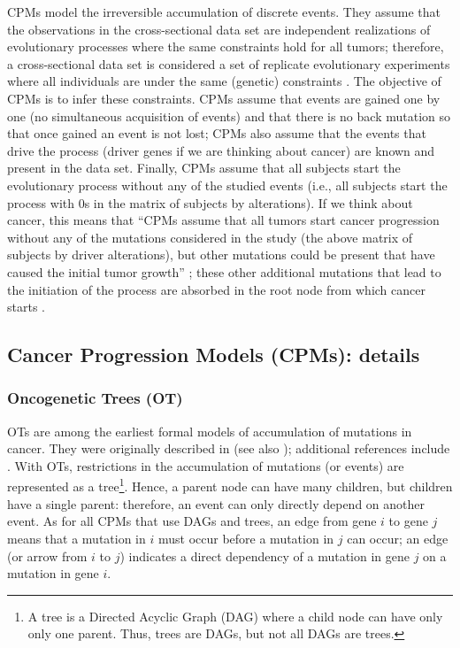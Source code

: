 \documentclass[a4paper,11pt]{article}
\begin{document}
CPMs model the irreversible accumulation of discrete events. They assume that the observations in the cross-sectional data set are independent realizations of evolutionary processes where the same constraints hold for all tumors; therefore, a cross-sectional data set is considered a set of replicate evolutionary experiments where all individuals are under the same (genetic) constraints \citep{gerstung2011temporal, Beerenwinkel2014, beerenwinkel_computational_2016, diaz2019every}. The objective of CPMs is to infer these constraints. CPMs assume that events are gained one by one (no simultaneous acquisition of events)  and that there is no back mutation so that once gained an event is not lost; CPMs also assume that the events that drive the process (driver genes if we are thinking about cancer) are known and present in the data set. Finally, CPMs assume that all subjects start the evolutionary process without any of the studied events (i.e., all subjects start the process with 0s in the matrix of subjects by alterations). If we think about cancer, this means that ``CPMs assume that all tumors start cancer progression without any of the mutations considered in the study (the above matrix of subjects by driver alterations), but other mutations could be present that have caused the initial tumor growth'' \citep{diaz2019every}; these other additional mutations that lead to the initiation of the process are absorbed in the root node from which cancer starts \citep{Attolini2010a}.



\subsection{Cancer Progression Models (CPMs): details}
\label{cpmdetails}


\subsubsection{Oncogenetic Trees (OT)}\label{otdetails}

OTs are among the earliest formal models of accumulation of mutations in cancer. They were originally described in  \citet{desper1999inferring} (see also \citealp{SimonDesper2000, RadmacherSimon2001}); additional references include \citet{Szabo2008, OTpackage, Szabo2002}. With OTs, restrictions in the accumulation of mutations (or events) are represented as a tree\footnote{A tree is a Directed Acyclic Graph (DAG) where a child node can have only only one parent. Thus, trees are DAGs, but not all DAGs are trees.}. Hence, a parent node can have many children, but children have a single parent: therefore, an event can only directly depend on another event. As for all CPMs that use DAGs and trees, an edge from gene $i$ to gene $j$ means that a mutation in $i$ must occur before a mutation in $j$ can occur; an edge (or arrow from $i$ to $j$) indicates a direct dependency of a mutation in gene $j$ on a mutation in gene $i$. 
\end{document}
